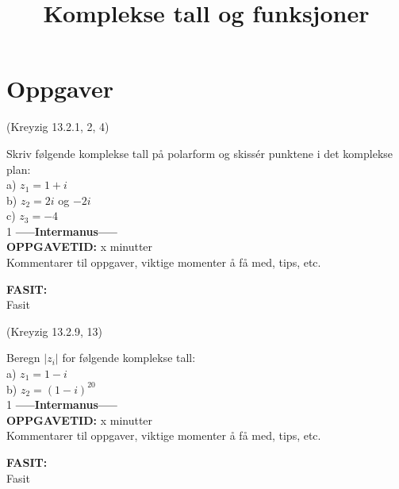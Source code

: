 \documentclass[a4paper,norsk,11pt]{style_interaktiv}
\title{Komplekse tall og funksjoner}
\begin{document}

\maketitle

\def\LF{0}  %





\section*{Oppgaver}

\begin{oppgave}{1}
(Kreyzig 13.2.1, 2, 4)

Skriv følgende komplekse tall på polarform og skissér punktene i det komplekse plan:\\
a) $z_1 = 1 +i$\\
b) $z_2 = 2i$ og $-2i$\\
c) $z_3 = -4$\\

\if\LF1
\textbf{-----Intermanus-----}\\
\textbf{OPPGAVETID: } x minutter\\
Kommentarer til oppgaver, viktige momenter å få med, tips, etc.

\textbf{FASIT: }\\
Fasit
\fi
\end{oppgave}


\begin{oppgave}{2}
(Kreyzig 13.2.9, 13)

Beregn $|z_i|$ for følgende komplekse tall:\\
a) $z_1 = 1 - i$\\
b) $z_2 = (1- i)^{20}$\\

\if\LF1
\textbf{-----Intermanus-----}\\
\textbf{OPPGAVETID: } x minutter\\
Kommentarer til oppgaver, viktige momenter å få med, tips, etc.

\textbf{FASIT: }\\
Fasit
\fi
\end{oppgave}
\end{document}
